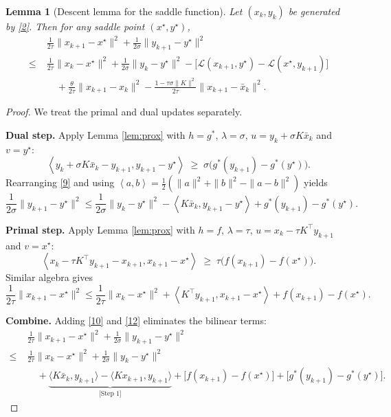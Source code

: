 \documentclass{article}
\newtheorem{lemma}{Lemma}
\newcommand{\inner}[2]{\left\langle #1,#2\right\rangle}
\begin{document}
\begin{lemma}[Descent lemma for the saddle function]\label{lem:descent}
Let $(x_{k},y_{k})$ be generated by \eqref{2}. Then for any saddle point $(x^{\star},y^{\star})$,
\[
\begin{aligned}
&\frac{1}{2\tau}\|x_{k+1}-x^{\star}\|^{2}
+\frac{1}{2\sigma}\|y_{k+1}-y^{\star}\|^{2}
\\
\le\;&
\frac{1}{2\tau}\|x_{k}-x^{\star}\|^{2}
+\frac{1}{2\sigma}\|y_{k}-y^{\star}\|^{2}
-\bigl[\mathcal{L}(x_{k+1},y^{\star})-\mathcal{L}(x^{\star},y_{k+1})\bigr]
\\
&\quad
+\frac{\theta}{2\tau}\|x_{k+1}-x_{k}\|^{2}
-\frac{1-\tau\sigma\|K\|^{2}}{2\tau}\|x_{k+1}-\bar x_{k}\|^{2}.
\end{aligned}
\tag{8}
\]
\end{lemma}
\begin{proof}
We treat the primal and dual updates separately.

\noindent\textbf{Dual step.} Apply Lemma \ref{lem:prox} with $h=g^{*}$, $\lambda=\sigma$, $u=y_{k}+\sigma K\bar x_{k}$ and $v=y^{\star}$:
\[
\inner{y_{k}+\sigma K\bar x_{k}-y_{k+1}}{y_{k+1}-y^{\star}}
\;\ge\;
\sigma\bigl(g^{*}(y_{k+1})-g^{*}(y^{\star})\bigr).
\tag{9}
\]
Rearranging \eqref{9} and using $\inner{a}{b}=\frac12(\|a\|^{2}+\|b\|^{2}-\|a-b\|^{2})$ yields
\[
\frac{1}{2\sigma}\|y_{k+1}-y^{\star}\|^{2}
\le \frac{1}{2\sigma}\|y_{k}-y^{\star}\|^{2}
-\inner{K\bar x_{k}}{y_{k+1}-y^{\star}}
+g^{*}(y_{k+1})-g^{*}(y^{\star}).
\tag{10}
\]

\noindent\textbf{Primal step.} Apply Lemma \ref{lem:prox} with $h=f$, $\lambda=\tau$, $u=x_{k}-\tau K^{\!\top}y_{k+1}$ and $v=x^{\star}$:
\[
\inner{x_{k}-\tau K^{\!\top}y_{k+1}-x_{k+1}}{x_{k+1}-x^{\star}}
\;\ge\;
\tau\bigl(f(x_{k+1})-f(x^{\star})\bigr).
\tag{11}
\]
Similar algebra gives
\[
\frac{1}{2\tau}\|x_{k+1}-x^{\star}\|^{2}
\le \frac{1}{2\tau}\|x_{k}-x^{\star}\|^{2}
+\inner{K^{\!\top}y_{k+1}}{x_{k+1}-x^{\star}}
+f(x_{k+1})-f(x^{\star}).
\tag{12}
\]

\noindent\textbf{Combine.} Adding \eqref{10} and \eqref{12} eliminates the bilinear terms:
\[
\begin{aligned}
&\frac{1}{2\tau}\|x_{k+1}-x^{\star}\|^{2}
+\frac{1}{2\sigma}\|y_{k+1}-y^{\star}\|^{2}
\\
\le\;&
\frac{1}{2\tau}\|x_{k}-x^{\star}\|^{2}
+\frac{1}{2\sigma}\|y_{k}-y^{\star}\|^{2}
\\
&\quad
+\underbrace{\bigl\langle K\bar x_{k},y_{k+1}\bigr\rangle
-\bigl\langle Kx_{k+1},y_{k+1}\bigr\rangle}_{\text{[Step 1]}}
+\bigl[f(x_{k+1})-f(x^{\star})\bigr]
+\bigl[g^{*}(y_{k+1})-g^{*}(y^{\star})\bigr].
\end{aligned}
\tag{13}
\]


\end{proof}
\end{document}
